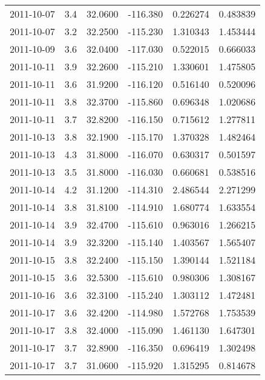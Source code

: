 \begin{tabular}{lrrrrr}
2011-10-07 &       3.4 &  32.0600 &  -116.380 &         0.226274 &         0.483839 \\
2011-10-07 &       3.2 &  32.2500 &  -115.230 &         1.310343 &         1.453444 \\
2011-10-09 &       3.6 &  32.0400 &  -117.030 &         0.522015 &         0.666033 \\
2011-10-11 &       3.9 &  32.2600 &  -115.210 &         1.330601 &         1.475805 \\
2011-10-11 &       3.6 &  31.9200 &  -116.120 &         0.516140 &         0.520096 \\
2011-10-11 &       3.8 &  32.3700 &  -115.860 &         0.696348 &         1.020686 \\
2011-10-11 &       3.7 &  32.8200 &  -116.150 &         0.715612 &         1.277811 \\
2011-10-13 &       3.8 &  32.1900 &  -115.170 &         1.370328 &         1.482464 \\
2011-10-13 &       4.3 &  31.8000 &  -116.070 &         0.630317 &         0.501597 \\
2011-10-13 &       3.5 &  31.8000 &  -116.030 &         0.660681 &         0.538516 \\
2011-10-14 &       4.2 &  31.1200 &  -114.310 &         2.486544 &         2.271299 \\
2011-10-14 &       3.8 &  31.8100 &  -114.910 &         1.680774 &         1.633554 \\
2011-10-14 &       3.9 &  32.4700 &  -115.610 &         0.963016 &         1.266215 \\
2011-10-14 &       3.9 &  32.3200 &  -115.140 &         1.403567 &         1.565407 \\
2011-10-15 &       3.8 &  32.2400 &  -115.150 &         1.390144 &         1.521184 \\
2011-10-15 &       3.6 &  32.5300 &  -115.610 &         0.980306 &         1.308167 \\
2011-10-16 &       3.6 &  32.3100 &  -115.240 &         1.303112 &         1.472481 \\
2011-10-17 &       3.6 &  32.4200 &  -114.980 &         1.572768 &         1.753539 \\
2011-10-17 &       3.8 &  32.4000 &  -115.090 &         1.461130 &         1.647301 \\
2011-10-17 &       3.7 &  32.8900 &  -116.350 &         0.696419 &         1.302498 \\
2011-10-17 &       3.7 &  31.0600 &  -115.920 &         1.315295 &         0.814678 \\

\end{tabular}
